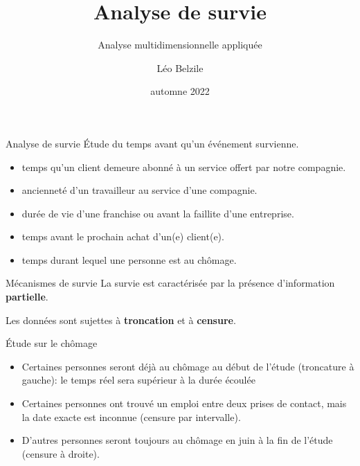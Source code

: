 \documentclass[
  ignorenonframetext,
]{beamer}
\title{Analyse de survie}
\subtitle{Analyse multidimensionnelle appliquée}
\author{Léo Belzile}
\date{automne 2022}
\institute{HEC Montréal}
\providecommand{\tightlist}{%
  \setlength{\itemsep}{0pt}\setlength{\parskip}{0pt}}\usepackage{longtable,booktabs,array}
\begin{document}
\frame{\titlepage}
\ifdefined\Shaded\renewenvironment{Shaded}{\begin{tcolorbox}[frame hidden, enhanced, boxrule=0pt, interior hidden, sharp corners, borderline west={3pt}{0pt}{shadecolor}, breakable]}{\end{tcolorbox}}\fi

\begin{frame}{Analyse de survie}
\protect\hypertarget{analyse-de-survie}{}
Étude du temps avant qu'un événement survienne.

\begin{itemize}
\tightlist
\item
  temps qu'un client demeure abonné à un service offert par notre
  compagnie.
\item
  ancienneté d'un travailleur au service d'une compagnie.
\item
  durée de vie d'une franchise ou avant la faillite d'une entreprise.
\item
  temps avant le prochain achat d'un(e) client(e).
\item
  temps durant lequel une personne est au chômage.
\end{itemize}
\end{frame}

\begin{frame}{Mécanismes de survie}
\protect\hypertarget{muxe9canismes-de-survie}{}
La survie est caractérisée par la présence d'information
\textbf{partielle}.

Les données sont sujettes à \textbf{troncation} et à \textbf{censure}.
\end{frame}

\begin{frame}{Étude sur le chômage}
\protect\hypertarget{uxe9tude-sur-le-chuxf4mage}{}
\begin{itemize}
\tightlist
\item
  Certaines personnes seront déjà au chômage au début de l'étude
  (troncature à gauche): le temps réel sera supérieur à la durée écoulée
\item
  Certaines personnes ont trouvé un emploi entre deux prises de contact,
  mais la date exacte est inconnue (censure par intervalle).
\item
  D'autres personnes seront toujours au chômage en juin à la fin de
  l'étude (censure à droite).
\end{itemize}
\end{frame}
\end{document}
